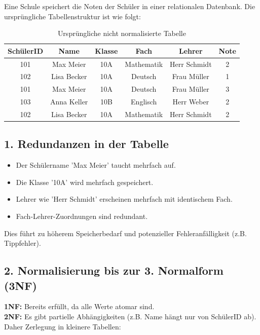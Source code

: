 \documentclass[a4paper,12pt]{article}
\begin{document}
		Eine Schule speichert die Noten der Schüler in einer relationalen Datenbank. Die ursprüngliche Tabellenstruktur ist wie folgt:
		
		\begin{table}[h]
			\centering
			\caption{Ursprüngliche nicht normalisierte Tabelle}
			\begin{tabular}{|c|c|c|c|c|c|}
				\hline
				\textbf{SchülerID} & \textbf{Name} & \textbf{Klasse} & \textbf{Fach} & \textbf{Lehrer} & \textbf{Note} \\
				\hline
				101 & Max Meier & 10A & Mathematik & Herr Schmidt & 2 \\
				102 & Lisa Becker & 10A & Deutsch & Frau Müller & 1 \\
				101 & Max Meier & 10A & Deutsch & Frau Müller & 3 \\
				103 & Anna Keller & 10B & Englisch & Herr Weber & 2 \\
				102 & Lisa Becker & 10A & Mathematik & Herr Schmidt & 2 \\
				\hline
			\end{tabular}
		\end{table}
		
		\subsection*{1. Redundanzen in der Tabelle}
		
		\begin{itemize}
			\item Der Schülername 'Max Meier' taucht mehrfach auf.
			\item Die Klasse '10A' wird mehrfach gespeichert.
			\item Lehrer wie 'Herr Schmidt' erscheinen mehrfach mit identischem Fach.
			\item Fach-Lehrer-Zuordnungen sind redundant.
		\end{itemize}
		
		Dies führt zu höherem Speicherbedarf und potenzieller Fehleranfälligkeit (z.B. Tippfehler).
		
		\subsection*{2. Normalisierung bis zur 3. Normalform (3NF)}
		
		\textbf{1NF:} Bereits erfüllt, da alle Werte atomar sind.\\
		\textbf{2NF:} Es gibt partielle Abhängigkeiten (z.B. Name hängt nur von SchülerID ab). Daher Zerlegung in kleinere Tabellen:
		
\end{document}

